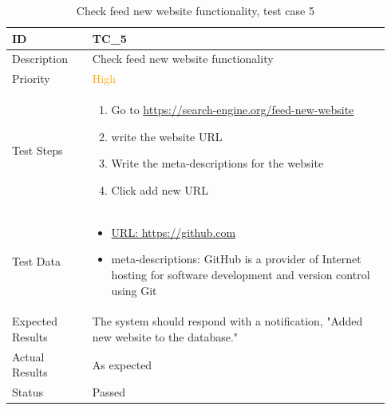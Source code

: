 \documentclass{scrartcl}
\begin{document}
\begin{table}[H]
  \caption{Check feed new website functionality, test case 5}
  \begin{tabular}{p{0.2\linewidth} | p{0.74\linewidth}}
    \toprule
    ID & TC\_5
    \\\midrule
    Description & Check feed new website functionality
    \\\hline
    Priority & \textcolor{orange}{High}
    \\\hline
    Test Steps & {
                 \begin{enumerate}
                 \item Go to \url{https://search-engine.org/feed-new-website}
                 \item write the website URL
                 \item Write the meta-descriptions for the website
                 \item Click add new URL
                 \end{enumerate}
                 }\vspace*{-\baselineskip}
    \\\hline
    Test Data & {
                \begin{itemize}
                \item \url{URL: https://github.com}
                \item meta-descriptions: GitHub is a provider of Internet hosting for software development and version control using Git
                \end{itemize}
                }\vspace*{-\baselineskip}
    \\\hline
    Expected Results & The system should respond with a notification, "Added new website to the database."
    \\\hline
    Actual Results & As expected
    \\\hline
    Status & Passed
    \\\bottomrule
  \end{tabular}
\end{table}
\end{document}
